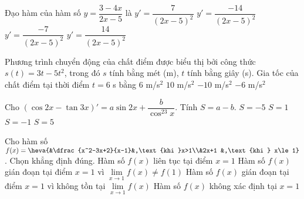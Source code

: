 \begin{ex}%
	Đạo hàm của hàm số $y=\dfrac{3-4x}{2x-5}$ là
	\choice
	{$y'=\dfrac{7}{(2x-5)^2}$}
	{$y'=\dfrac{-14}{(2x-5)^2}$}
	{$y'=\dfrac{-7}{(2x-5)^2}$}
	{$y'=\dfrac{14}{(2x-5)^2}$}
\end{ex}

\begin{ex}%
	Phương trình chuyển động của chất điểm được biểu thị bởi công thức $s(t)=3t-5t^2$, trong đó $s$ tính bằng mét (m), $t$ tính bằng giây (s). Gia tốc của chất điểm tại thời điểm $t=6$ s bằng
	\choice
	{$6$ m/s$^2$}
	{$10$ m/s$^2$}
	{\True $-10$ m/s$^2$}
	{$-6$ m/s$^2$}
\end{ex}

\begin{ex}%
	Cho $\left(\cos 2x-\tan 3x\right)'=a\sin 2x+\dfrac{b}{\cos^23x}$. Tính $S=a-b$.
	\choice
	{$S=-5$}
	{\True $S=1$}
	{$S=-1$}
	{$S=5$}
\end{ex}

\begin{ex}%
	Cho hàm số $f(x)=\heva{&\dfrac{x^2-3x+2}{x-1}&,\text{khi }x>1\\&2x+1 &,\text{khi } x\le 1}$. Chọn khẳng định đúng.
	\choice
	{Hàm số $f(x)$ liên tục tại điểm $x=1$}
	{Hàm số $f(x)$ gián đoạn tại điểm $x=1$ vì $\lim\limits_{x\to 1}f(x)\ne f(1)$}
	{\True Hàm số $f(x)$ gián đoạn tại điểm $x=1$ vì không tồn tại $\lim\limits_{x\to 1}f(x)$}
	{Hàm số $f(x)$ không xác định tại $x=1$}
\end{ex}

